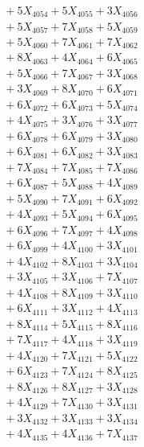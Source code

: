 \documentclass[a4paper,10pt]{article}
\begin{document}
{\begin{align}
&\;  + 5 X_{4054} + 5 X_{4055} + 3 X_{4056} \\[0.3ex]
&\;  + 5 X_{4057} + 7 X_{4058} + 5 X_{4059} \\[0.5ex]\allowbreak
&\;  + 5 X_{4060} + 7 X_{4061} + 7 X_{4062} \\[0.3ex]
&\;  + 8 X_{4063} + 4 X_{4064} + 6 X_{4065} \\[0.3ex]
&\;  + 5 X_{4066} + 7 X_{4067} + 3 X_{4068} \\[0.3ex]
&\;  + 3 X_{4069} + 8 X_{4070} + 6 X_{4071} \\[0.3ex]
&\;  + 6 X_{4072} + 6 X_{4073} + 5 X_{4074} \\[0.3ex]
&\;  + 4 X_{4075} + 3 X_{4076} + 3 X_{4077} \\[0.3ex]
&\;  + 6 X_{4078} + 6 X_{4079} + 3 X_{4080} \\[0.3ex]
&\;  + 6 X_{4081} + 6 X_{4082} + 3 X_{4083} \\[0.3ex]
&\;  + 7 X_{4084} + 7 X_{4085} + 7 X_{4086} \\[0.3ex]
&\;  + 6 X_{4087} + 5 X_{4088} + 4 X_{4089} \\[0.5ex]\allowbreak
&\;  + 5 X_{4090} + 7 X_{4091} + 6 X_{4092} \\[0.3ex]
&\;  + 4 X_{4093} + 5 X_{4094} + 6 X_{4095} \\[0.3ex]
&\;  + 6 X_{4096} + 7 X_{4097} + 4 X_{4098} \\[0.3ex]
&\;  + 6 X_{4099} + 4 X_{4100} + 3 X_{4101} \\[0.3ex]
&\;  + 4 X_{4102} + 8 X_{4103} + 3 X_{4104} \\[0.3ex]
&\;  + 3 X_{4105} + 3 X_{4106} + 7 X_{4107} \\[0.3ex]
&\;  + 4 X_{4108} + 8 X_{4109} + 3 X_{4110} \\[0.3ex]
&\;  + 6 X_{4111} + 3 X_{4112} + 4 X_{4113} \\[0.3ex]
&\;  + 8 X_{4114} + 5 X_{4115} + 8 X_{4116} \\[0.3ex]
&\;  + 7 X_{4117} + 4 X_{4118} + 3 X_{4119} \\[0.5ex]\allowbreak
&\;  + 4 X_{4120} + 7 X_{4121} + 5 X_{4122} \\[0.3ex]
&\;  + 6 X_{4123} + 7 X_{4124} + 8 X_{4125} \\[0.3ex]
&\;  + 8 X_{4126} + 8 X_{4127} + 3 X_{4128} \\[0.3ex]
&\;  + 4 X_{4129} + 7 X_{4130} + 3 X_{4131} \\[0.3ex]
&\;  + 3 X_{4132} + 3 X_{4133} + 3 X_{4134} \\[0.3ex]
&\;  + 4 X_{4135} + 4 X_{4136} + 7 X_{4137} \\[0.3ex]

\end{align}}
\end{document}
